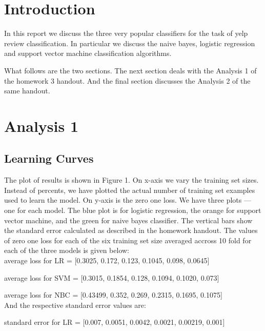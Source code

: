 \documentclass[12pt]{article}
\begin{document}
\maketitle

\newpage

\section{Introduction}

In this report we discuss the three very popular classifiers for the task of yelp review
classification. In particular we discuss the naive bayes, logistic regression and support
vector machine classification algorithms.

What follows are the two sections. The next section deals with the Analysis 1 
of the homework 3 handout. And the final section discusses the Analysis 2 of the 
same handout.

\section{Analysis 1}

\subsection{Learning Curves}
The plot of results is shown in Figure 1. On x-axis we vary the training set sizes. Instead
of percents, we have plotted the actual number of training set examples used to learn
the model. On y-axis is the zero one loss. We have three plots --- one for each model.
The blue plot is for logistic regression, the orange for support vector machine, and the
green for naive bayes classifier. The vertical bars show the standard error calculated as
described in the homework handout. The values of zero one loss for each of the six 
training set size averaged accross 10 fold for each of the three models is given below:
\\

average loss for LR = [0.3025, 0.172, 0.123, 0.1045, 0.098, 0.0645]

average loss for SVM = [0.3015, 0.1854, 0.128, 0.1094, 0.1020, 0.073]

average loss for NBC = [0.43499, 0.352, 0.269, 0.2315, 0.1695, 0.1075]
\\

And the respective standard error values are:

standard error for LR = [0.007, 0.0051, 0.0042, 0.0021, 0.00219, 0.001]
\end{document}
